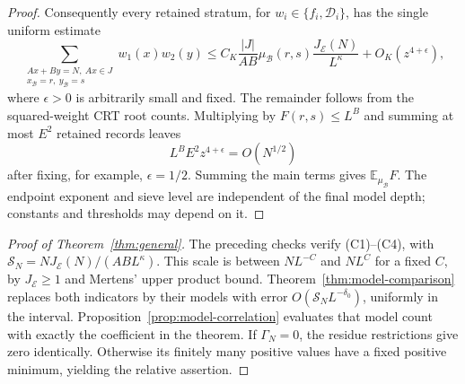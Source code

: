 \begin{proof}
Consequently every retained stratum, for \(w_i\in\{f_i,\mathcal D_i\}\),
has the single uniform estimate
\[
 \sum_{\substack{Ax+By=N,\ Ax\in J\\
                  x_{\mathcal B}=r,\ y_{\mathcal B}=s}}
          w_1(x)w_2(y)
 \le C_K\frac{|J|}{AB}\mu_{\mathcal B}(r,s)
             \frac{J_{\mathcal E}(N)}{L^\kappa}
        +O_K(z^{4+\epsilon}),
\]
where \(\epsilon>0\) is arbitrarily small and fixed.
The remainder follows from the squared-weight CRT root counts.
Multiplying by \(F(r,s)\le L^B\) and summing at most \(E^2\)
retained records leaves
\[
 L^BE^2z^{4+\epsilon}=O(N^{1/2})
\]
after fixing, for example, \(\epsilon=1/2\).
Summing the main terms gives \(\mathbb E_{\mu_{\mathcal B}}F\).
The endpoint exponent and sieve level are independent of the final
model depth; constants and thresholds may depend on it.
\end{proof}

\begin{proof}[Proof of Theorem~\ref{thm:general}]
The preceding checks verify (C1)--(C4), with
\(\mathcal S_N=NJ_{\mathcal E}(N)/(AB L^\kappa)\).
This scale is between \(NL^{-C}\) and \(NL^C\) for a fixed \(C\),
by \(J_{\mathcal E}\ge1\) and Mertens' upper product bound.
Theorem~\ref{thm:model-comparison} replaces both indicators by their
models with error \(O(\mathcal S_NL^{-\delta_0})\), uniformly in
the interval. Proposition~\ref{prop:model-correlation} evaluates that
model count with exactly the coefficient in the theorem.
If \(\Gamma_N=0\), the residue restrictions give zero identically.
Otherwise its finitely many positive values have a fixed positive
minimum, yielding the relative assertion.
\end{proof}


